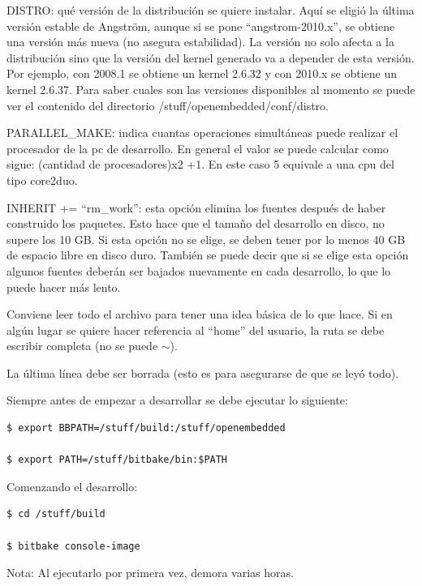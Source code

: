 \bigskip
DISTRO: qué versión de la distribución se quiere instalar. Aquí se eligió la última versión estable de Angström, aunque si se pone “angstrom-2010.x”, se obtiene una versión más nueva (no asegura estabilidad). La versión no solo afecta a la distribución sino que la versión del kernel generado va a depender de esta versión. Por ejemplo, con 2008.1 se obtiene un kernel 2.6.32 y con 2010.x se obtiene un kernel 2.6.37. Para saber cuales son las versiones disponibles al momento se puede ver el contenido del directorio 
/stuff/openembedded/conf/distro.

\bigskip
PARALLEL\_MAKE: indica cuantas operaciones simultáneas puede realizar el procesador de la pc de desarrollo. En general el valor se puede calcular como sigue: (cantidad de procesadores)x2 +1. En este caso 5 equivale a una cpu del tipo core2duo.

\bigskip
INHERIT += “rm\_work”: esta opción elimina los fuentes después de haber construido los paquetes. Esto hace que el tamaño del desarrollo en disco, no supere los 10 GB. Si esta opción no se elige, se deben tener por lo menos 40 GB de espacio libre en disco duro. También se puede decir que si se elige esta opción algunos fuentes deberán ser bajados nuevamente en cada desarrollo, lo que lo puede hacer más lento.


\bigskip
Conviene leer todo el archivo para tener una idea básica de lo que hace. Si en algún lugar se quiere hacer referencia al “home” del usuario, la ruta se debe escribir completa (no se puede $\sim$).

La última línea debe ser borrada (esto es para asegurarse de que se leyó todo). 

\bigskip
{}

\bigskip
Siempre antes de empezar a desarrollar se debe ejecutar lo siguiente:

\begin{verbatim}
$ export BBPATH=/stuff/build:/stuff/openembedded

$ export PATH=/stuff/bitbake/bin:$PATH
\end{verbatim}

Comenzando el desarrollo:

\begin{verbatim}
$ cd /stuff/build

$ bitbake console-image
\end{verbatim}

Nota: Al ejecutarlo por primera vez, demora varias horas. 

